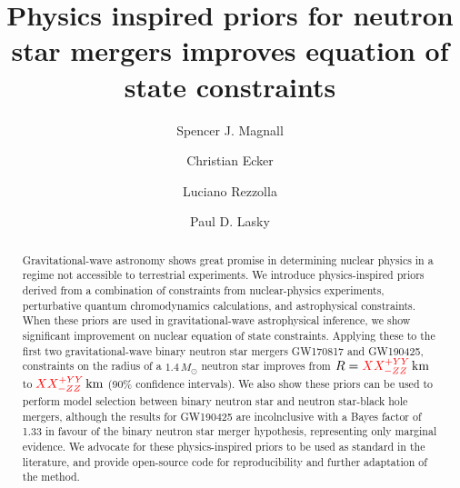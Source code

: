 \documentclass[twocolumn]{aastex631}
\begin{document}
	
	\title{Physics inspired priors for neutron star mergers improves equation of state constraints}
	
	\author[0009-0000-7037-1809]{Spencer J. Magnall}
	
	
	\author{Christian Ecker}
	
	\author{Luciano Rezzolla}
	
	
	\author[0000-0003-3763-1386]{Paul D. Lasky}
	
	
	
	
	\begin{abstract}
		Gravitational-wave astronomy shows great promise in determining nuclear physics in a regime not accessible to terrestrial experiments. 
		We introduce physics-inspired priors derived from a combination of constraints from nuclear-physics experiments, perturbative quantum chromodynamics calculations, and astrophysical constraints.
		When these priors are used in gravitational-wave astrophysical inference, we show significant improvement on nuclear equation of state constraints. 
		Applying these to the first two gravitational-wave binary neutron star mergers GW170817 and GW190425, constraints on the radius of a $1.4\,M_\odot$ neutron star improves from $R=\textcolor{red}{XX^{+YY}_{-ZZ}}\,{\rm km}$ to $\textcolor{red}{XX^{+YY}_{-ZZ}}\,{\rm km}$ (90\% confidence intervals).
		We also show these priors can be used to perform model selection between binary neutron star and neutron star-black hole mergers, although the results for GW190425 are incolnclusive with a Bayes factor of 1.33 in favour of the binary neutron star merger hypothesis, representing only marginal evidence.
		We advocate for these physics-inspired priors to be used as standard in the literature, and provide open-source code for reproducibility and further adaptation of the method.
	\end{abstract}
	
\end{document}
